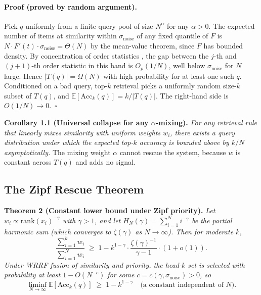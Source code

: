 \documentclass[11pt]{article}
\begin{document}
\paragraph{Proof (proved by random argument).}
Pick $q$ uniformly from a finite query pool of size $N^\alpha$ for
any $\alpha > 0$.  The expected number of items at similarity
within $\sigma_{\mathrm{noise}}$ of any fixed quantile of $F$ is
$N \cdot F'(t) \cdot \sigma_{\mathrm{noise}} = \Theta(N)$ by the
mean-value theorem, since $F$ has bounded density.  By
concentration of order statistics \citep{Bickel1976}, the gap
between the $j$-th and $(j+1)$-th order statistic in this band is
$O_p(1/N)$, well below $\sigma_{\mathrm{noise}}$ for $N$ large.
Hence $|T(q)| = \Omega(N)$ with high probability for at least one
such $q$.  Conditioned on a bad query, top-$k$ retrieval picks a
uniformly random size-$k$ subset of $T(q)$, and
$\mathbb{E}[\mathrm{Acc}_k(q)] = k / |T(q)|$.  The right-hand side
is $O(1/N) \to 0$.~$\square$

\textbf{Corollary 1.1 (Universal collapse for any $\alpha$-mixing).}
\emph{For any retrieval rule that linearly mixes similarity with
uniform weights $w_i$, there exists a query distribution under
which the expected top-$k$ accuracy is bounded above by $k/N$
asymptotically.}  The mixing weight $\alpha$ cannot rescue the
system, because $w$ is constant across $T(q)$ and adds no signal.

\subsection{The Zipf Rescue Theorem}
\label{app:erdos-thm2}

\textbf{Theorem 2 (Constant lower bound under Zipf priority).}
\emph{Let $w_i \propto \mathrm{rank}(x_i)^{-\gamma}$ with
$\gamma > 1$, and let $H_N(\gamma) = \sum_{i=1}^N i^{-\gamma}$ be
the partial harmonic sum (which converges to $\zeta(\gamma)$ as
$N \to \infty$).  Then for moderate $k$,}
\begin{equation}
\frac{\sum_{i=1}^{k} w_i}{\sum_{i=1}^{N} w_i}
\;\ge\;
1 - k^{1-\gamma} \cdot \frac{\zeta(\gamma)^{-1}}{\gamma - 1} \cdot (1 + o(1)).
\label{eq:thm2-mass}
\end{equation}
\emph{Under WRRF fusion of similarity and priority, the head-$k$
set is selected with probability at least $1 - O(N^{-c})$ for some
$c = c(\gamma, \sigma_{\mathrm{noise}}) > 0$, so}
\begin{equation}
\liminf_{N \to \infty} \mathbb{E}[\mathrm{Acc}_k(q)]
\;\ge\;
1 - k^{1-\gamma}
\quad \text{(a constant independent of } N\text{).}
\label{eq:thm2-acc}
\end{equation}
\end{document}
